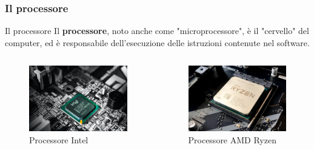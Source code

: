 \subsubsection[Il processore]{Il processore}
\begin{frame}
	
	\begin{block}{Il processore}
		Il \textbf{processore}, noto anche come "microprocessore", è il "cervello" del computer, ed è responsabile dell'esecuzione delle istruzioni contenute nel software.
	\end{block}

	\begin{columns}			
		\begin{figure}[!htbp] 
			\centering
			\includegraphics[width=1.0\linewidth]{images/3_modelli/intel.jpg}
			\caption{Processore Intel}
			\label{fig:models_intel}
		\end{figure}
					
		\begin{figure}[!htbp] 
			\centering
			\includegraphics[width=1.0\linewidth]{images/3_modelli/ryzen.jpg}
			\caption{Processore AMD Ryzen}
			\label{fig:models_ryzen}
		\end{figure}
		
	\end{columns}
	
\end{frame}



